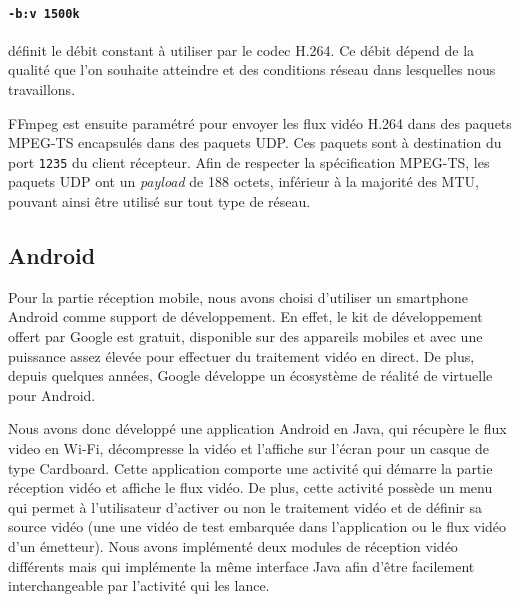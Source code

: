 \documentclass[11pt,a4paper]{article}
\begin{document}
\paragraph{\texttt{-b:v 1500k}} définit le débit constant à utiliser par le codec H.264.
Ce débit dépend de la qualité que l'on souhaite atteindre et des conditions réseau dans lesquelles nous travaillons.

\bigbreak
FFmpeg est ensuite paramétré pour envoyer les flux vidéo H.264 dans des paquets MPEG-TS encapsulés dans des paquets UDP.
Ces paquets sont à destination du port \texttt{1235} du client récepteur.
Afin de respecter la spécification MPEG-TS, les paquets UDP ont un \textit{payload} de 188 octets, inférieur à la majorité des MTU, pouvant ainsi être utilisé sur tout type de réseau.

\subsection{Android}
Pour la partie réception mobile, nous avons choisi d'utiliser un smartphone Android comme support de développement.
En effet, le kit de développement offert par Google est gratuit, disponible sur des appareils mobiles et avec une puissance assez élevée pour effectuer du traitement vidéo en direct.
De plus, depuis quelques années, Google développe un écosystème de réalité de virtuelle pour Android.

\bigbreak
Nous avons donc développé une application Android en Java, qui récupère le flux video en Wi-Fi, décompresse la vidéo et l'affiche sur l'écran pour un casque de type Cardboard.
Cette application comporte une activité qui démarre la partie réception vidéo et affiche le flux vidéo. De plus, cette activité possède un menu qui permet à l'utilisateur d'activer ou non le traitement vidéo et de définir sa source vidéo (une une vidéo de test embarquée dans l'application ou le flux vidéo d'un émetteur).
Nous avons implémenté deux modules de réception vidéo différents mais qui implémente la même interface Java afin d'être facilement interchangeable par l'activité qui les lance.
\end{document}
